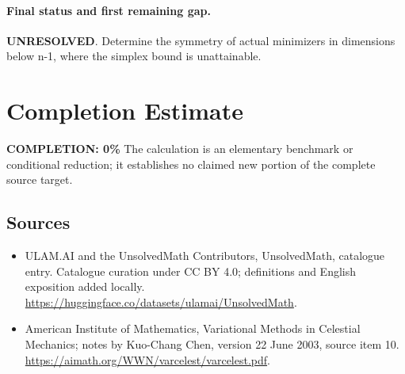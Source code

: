 \documentclass[11pt]{article}
\begin{document}
\paragraph{Final status and first remaining gap.}
\textbf{UNRESOLVED}. Determine the symmetry of actual minimizers in dimensions below n-1, where the simplex bound is unattainable.

\section{Completion Estimate}
\noindent\textbf{COMPLETION: 0\%}
The calculation is an elementary benchmark or conditional reduction; it establishes no claimed new portion of the complete source target.

\subsection{Sources}
\begin{itemize}
\item[\hypertarget{source:statement:1}{S1}] ULAM.AI and the UnsolvedMath Contributors, UnsolvedMath, catalogue entry. Catalogue curation under CC BY 4.0; definitions and English exposition added locally.
\url{https://huggingface.co/datasets/ulamai/UnsolvedMath}.
\item[\hypertarget{source:statement:2}{S2}] American Institute of Mathematics, Variational Methods in Celestial Mechanics; notes by Kuo-Chang Chen, version 22 June 2003, source item 10.
\url{https://aimath.org/WWN/varcelest/varcelest.pdf}.
\end{itemize}
\label{end:statement}
\end{document}
